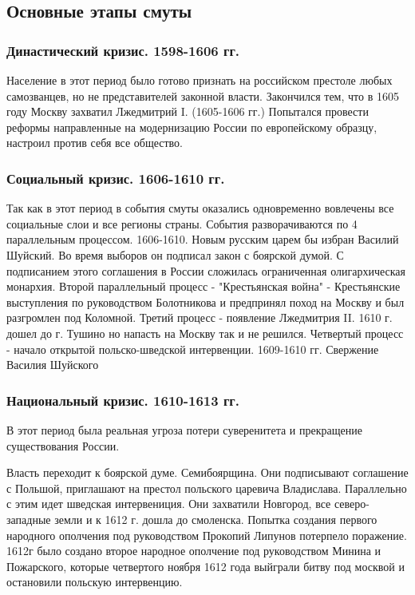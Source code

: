 \documentclass[a4paper]{article}
\begin{document}
\subsection{Основные этапы смуты}
\subsubsection{Династический кризис. 1598-1606 гг.}
Население в этот период было готово признать на российском престоле любых самозванцев, но не представителей законной власти.
Закончился тем, что в 1605 году Москву захватил Лжедмитрий I. (1605-1606 гг.)
Попытался провести реформы направленные на модернизацию России по европейскому образцу, настроил против себя все общество.
\subsubsection{Социальный кризис. 1606-1610 гг.}
Так как в этот период в события смуты оказались одновременно вовлечены все социальные слои и все регионы страны. События разворачиваются по 4 параллельным процессом.
1606-1610. Новым русским царем бы избран Василий Шуйский. Во время выборов он подписал закон с боярской думой. С подписанием этого соглашения в России сложилась ограниченная олигархическая монархия.
Второй параллельный процесс - "Крестьянская война" - Крестьянские выступления по руководством Болотникова и предпринял поход на Москву и был разгромлен под Коломной.
Третий процесс - появление Лжедмитрия II. 1610 г. дошел до г. Тушино но напасть на Москву так и не решился.
Четвертый процесс - начало открытой польско-шведской интервенции. 1609-1610 гг.
Свержение Василия Шуйского
\subsubsection{Национальный кризис. 1610-1613 гг.}
В этот период была реальная угроза потери суверенитета и прекращение существования России.

Власть переходит к боярской думе. Семибоярщина. Они подписывают соглашение с Польшой, приглашают на престол польского царевича Владислава.
Параллельно с этим идет шведская интервениция. Они захватили Новгород, все северо-западные земли и к 1612 г. дошла до смоленска.
Попытка создания первого народного ополчения под руководством Прокопий Липунов потерпело поражение.
1612г было создано второе народное ополчение под руководством Минина и Пожарского, которые четвертого ноября 1612 года выйграли битву под москвой и остановили польскую интервенцию.
\end{document}
